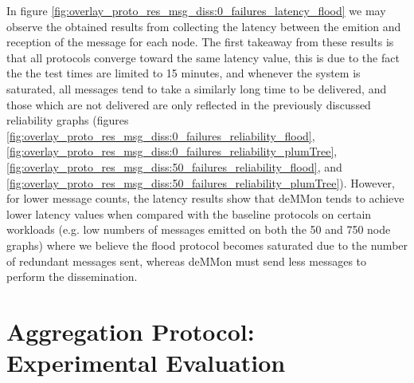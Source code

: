 In figure \ref{fig:overlay_proto_res_msg_diss:0_failures_latency_flood} we may observe the obtained results from collecting the latency between the emition and reception of the message for each node. The first takeaway from these results is that all protocols converge toward the same latency value, this is due to the fact the the test times are limited to 15 minutes, and whenever the system is saturated, all messages tend to take a similarly long time to be delivered, and those which are not delivered are only reflected in the previously discussed reliability graphs (figures \ref{fig:overlay_proto_res_msg_diss:0_failures_reliability_flood}, \ref{fig:overlay_proto_res_msg_diss:0_failures_reliability_plumTree}, \ref{fig:overlay_proto_res_msg_diss:50_failures_reliability_flood}, and \ref{fig:overlay_proto_res_msg_diss:50_failures_reliability_plumTree}). However, for lower message counts, the latency results show that deMMon tends to achieve lower latency values when compared with the baseline protocols on certain workloads (e.g. low numbers of messages emitted on both the 50 and 750 node graphs) where we believe the flood protocol becomes saturated due to the number of redundant messages sent, whereas deMMon must send less messages to perform the dissemination.



\section{Aggregation Protocol: Experimental Evaluation} \label{sec:agg_proto_eval}




